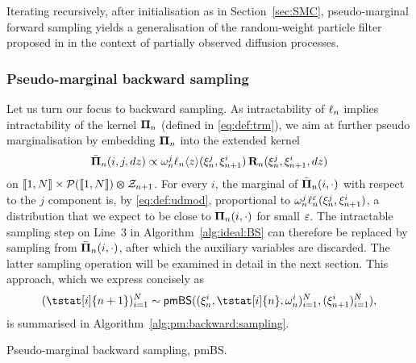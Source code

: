 Iterating recursively, after initialisation as in Section~\ref{sec:SMC}, pseudo-marginal forward sampling yields a generalisation of the random-weight particle filter proposed in \cite{fearnhead2008particle} in the context of partially observed diffusion processes. 

\subsubsection{Pseudo-marginal backward sampling}
\label{eq:sec:backward:sampling:pseudo:marg}

Let us turn our focus to backward sampling. As intractability of $\ell_{n}$ implies intractability of the kernel $\boldsymbol{\Pi}_{n}$ (defined in \eqref{eq:def:trm}), we aim at further pseudo marginalisation by embedding $\boldsymbol{\Pi}_{n}$ into the extended kernel  
$$
\bar{\boldsymbol{\Pi}}_{n}(i, j, d z) \propto \omega_{n}^{j} \ell_{n} \langle z \rangle(\xi_{n}^{j}, \xi_{n + 1}^{i}) \, \mathbf{R}_{n}(\xi_{n}^{j}, \xi_{n + 1}^{i}, d z)
$$
on $\llbracket 1, N \rrbracket \times \mathcal{P}(\llbracket 1, N \rrbracket) \varotimes \mathcal{Z}_{n + 1}$. For every $i$, the marginal of $\bar{\boldsymbol{\Pi}}_{n}(i, \cdot)$ with respect to the $j$ component is, by \eqref{eq:def:udmod}, proportional to $\omega_{n}^{j} \ell^\varepsilon_{n}(\xi_{n}^{j}, \xi_{n + 1}^{i})$, a distribution that we expect to be close to $\boldsymbol{\Pi}_{n}(i, \cdot)$ for small $\varepsilon$. The intractable sampling step on Line~3 in Algorithm~\ref{alg:ideal:BS} can therefore be replaced by sampling from $\bar{\boldsymbol{\Pi}}_{n}(i, \cdot)$, after which the auxiliary variables are discarded. The latter sampling operation will be examined in detail in the next section. This approach, which we express concisely as 
$$
    (\tstat[i]{n + 1})_{i = 1}^\N \sim \mathsf{pmBS}((\epart{n}{i}, \tstat[i]{n}, \ewght{n}{i})_{i = 1}^\N, (\epart{n + 1}{i})_{i = 1}^\N), 
$$
is summarised in Algorithm~\ref{alg:pm:backward:sampling}.  

\begin{algorithm}[h] 
\caption{Pseudo-marginal backward sampling, \textsf{pmBS}.} \label{alg:pm:backward:sampling}
\end{algorithm}

